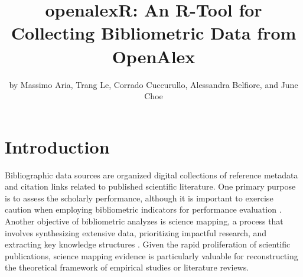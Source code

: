 
\title{openalexR: An R-Tool for Collecting Bibliometric Data from OpenAlex}
\author{by Massimo Aria, Trang Le, Corrado Cuccurullo, Alessandra Belfiore, and June Choe}

\maketitle


\section{Introduction}
Bibliographic data sources are organized digital collections of reference metadata and citation links related to published scientific literature. One primary purpose is to assess the scholarly performance, although it is important to exercise caution when employing bibliometric indicators for performance evaluation \citep{van2013scientists, hicks2015bibliometrics, priem2011altmetrics}. Another objective of bibliometric analyzes is science mapping, a process that involves synthesizing extensive data, prioritizing impactful research, and extracting key knowledge structures \citep{chen2017science}. Given the rapid proliferation of scientific publications, science mapping evidence is particularly valuable for reconstructing the theoretical framework of empirical studies or literature reviews.


